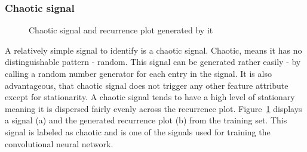 \documentclass[a4paper,12pt,fleqn]{article}
\begin{document}
\subsubsection{Chaotic signal}
\begin{figure}
  \centering
  \qquad
  \caption{Chaotic signal and recurrence plot generated by it}
  \label{fig:generated_chaotic}
\end{figure}
A relatively simple signal to identify is a chaotic signal.
Chaotic, means it has no distinguishable pattern - random.
This signal can be generated rather easily - by calling a random number generator for each entry in the signal.
It is also advantageous, that chaotic signal does not trigger any other feature attribute except for stationarity.
A chaotic signal tends to have a high level of stationary meaning it is dispersed fairly evenly across the recurrence plot.
Figure~\ref{fig:generated_chaotic} displays a signal (a) and the generated recurrence plot (b) from the training set.
This signal is labeled as chaotic and is one of the signals used for training the convolutional neural network.


\end{document}
